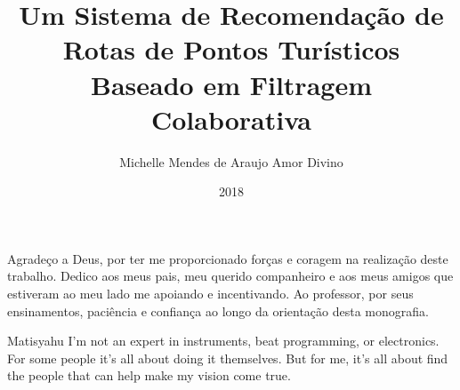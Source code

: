 \documentclass[pt,twoside,onehalfspacing,bsc]{risethesis}
\title{Um Sistema de Recomendação de Rotas de Pontos Turísticos Baseado em Filtragem Colaborativa}
\date{2018}
\author{Michelle Mendes de Araujo Amor Divino}
\begin{document}
\frontmatter

\frontpage

\presentationpage

\begin{fichacatalografica}
	\FichaCatalografica 
\end{fichacatalografica}


\begin{dedicatory}
Agradeço a Deus, por ter me proporcionado forças e coragem na realização deste trabalho.
Dedico aos meus pais, meu querido companheiro e aos meus amigos que estiveram ao meu lado me apoiando e incentivando.
Ao professor, por seus ensinamentos, paciência e confiança ao longo da orientação desta monografia.
\end{dedicatory}

\begin{epigraph}[]{Matisyahu}
I'm not an expert in instruments, beat programming, or electronics. For some people it's all about doing it themselves. But for me, it's all about find the people that can help make my vision come true.
\end{epigraph}

\resumo


\abstract


\listoffigures

\listoftables

\listofacronyms


\tableofcontents

\mainmatter









\begin{references}
  
\end{references}
\end{document}
